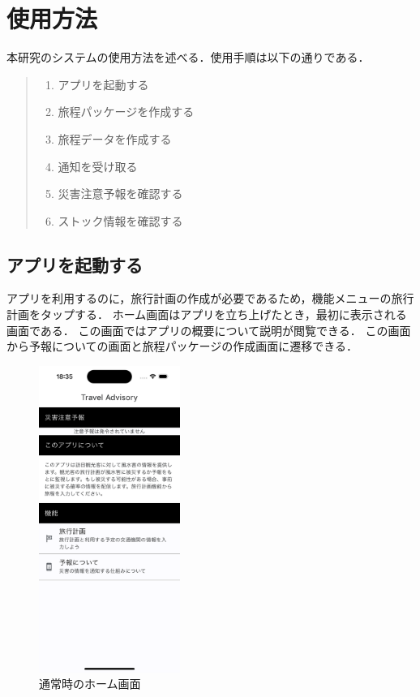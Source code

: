 \section{使用方法}

本研究のシステムの使用方法を述べる．使用手順は以下の通りである．

\begin{quote}
  \begin{enumerate}
    \item アプリを起動する
    \item 旅程パッケージを作成する
    \item 旅程データを作成する
    \item 通知を受け取る
    \item 災害注意予報を確認する
    \item ストック情報を確認する
  \end{enumerate}
\end{quote}

\subsection{アプリを起動する}
アプリを利用するのに，旅行計画の作成が必要であるため，機能メニューの旅行計画をタップする．
ホーム画面はアプリを立ち上げたとき，最初に表示される画面である．
この画面ではアプリの概要について説明が閲覧できる．
この画面から予報についての画面と旅程パッケージの作成画面に遷移できる．

\begin{figure}[H]
  \centering
  \includegraphics[height=10cm]{./fig/normal_home_screen.png}
  \caption{通常時のホーム画面}
  \label{fig:normal_home_screen}
\end{figure}


